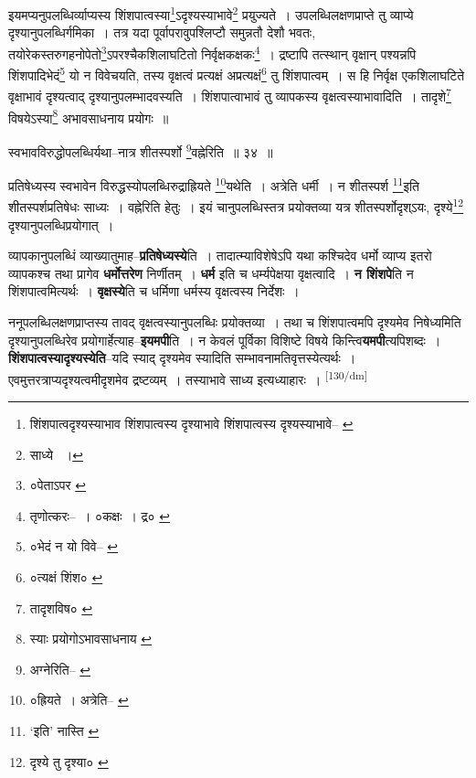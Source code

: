 \documentclass[article,12pt,a4paper]{memoir}
\begin{document}
	  \pstart इयमप्यनुपलब्धिर्व्याप्यस्य शिंशपात्वस्या\footnote{शिंशपात्वदृश्यस्याभाव \cite{dp-msB} शिंशपात्वस्य दृश्याभावे \cite{dp-msA} \cite{dp-edP} \cite{dp-edH} \cite{dp-edE} \cite{dp-edN} शिंशपात्वस्य दृश्यस्याभावे--\cite{dp-msC} \cite{dp-msD}}ऽदृश्यस्याभावे\footnote{साध्ये \cite{dp-msD-n} ।} प्रयुज्यते । उपलब्धिलक्षणप्राप्ते तु व्याप्ये दृश्यानुपलब्धिर्गमिका । तत्र यदा पूर्वापरावुपश्लिप्टौ समुन्नतौ देशौ भवतः, तयोरेकस्तरुगहनोपेतो\footnote{०पेताऽपर \cite{dp-msC}}ऽपरश्चैकशिलाघटितो निर्वृक्षकक्षकः\footnote{तृणोत्करः--\cite{dp-msD-n} । ०कक्षः । द्र० \cite{dp-msA} \cite{dp-msB} \cite{dp-msC} \cite{dp-msD} \cite{dp-edP} \cite{dp-edH} \cite{dp-edE} \cite{dp-edN}} । द्रष्टापि तत्स्थान् वृक्षान् पश्यन्नपि शिंशपादिभेदं\footnote{०भेदं न यो विवे--\cite{dp-msA} \cite{dp-edP} \cite{dp-edH} \cite{dp-edE}} यो न विवेचयति, तस्य वृक्षत्वं प्रत्यक्षं अप्रत्यक्षं\footnote{०त्यक्षं शिंश० \cite{dp-msA} \cite{dp-msB} \cite{dp-msC} \cite{dp-edH} \cite{dp-edE} \cite{dp-edN}} तु शिंशपात्वम् । स हि निर्वृक्ष एकशिलाघटिते वृक्षाभावं दृश्यत्वाद् दृश्यानुपलम्भादवस्यति । शिंशपात्वाभावं तु व्यापकस्य वृक्षत्वस्याभावादिति । तादृशे\footnote{तादृशविष० \cite{dp-msA}} विषयेऽस्या\footnote{स्याः प्रयोगोऽभावसाधनाय \cite{dp-msC}} अभावसाधनाय प्रयोगः ॥
	\pend
       

	  \pstart स्वभावविरुद्धोपलब्धिर्यथा--नात्र शीतस्पर्शो \footnote{अग्नेरिति--\cite{dp-msB} \cite{dp-edP} \cite{dp-edH} \cite{dp-edE} \cite{dp-edN}}वह्नेरिति ॥ ३४ ॥
	\pend
       

	  \pstart प्रतिषेध्यस्य स्वभावेन विरुद्धस्योपलब्धिरुद्राह्रियते \footnote{०ह्रियते । अत्रेति--\cite{dp-msB} \cite{dp-msC} \cite{dp-msD}}यथेति । अत्रेति धर्मी । न शीतस्पर्श \footnote{‘इति’ नास्ति \cite{dp-msA}}इति शीतस्पर्शप्रतिषेधः साध्यः । वह्नेरिति हेतुः । इयं चानुपलब्धिस्तत्र प्रयोक्तव्या यत्र शीतस्पर्शोदृश्ऽयः, दृश्ये\footnote{दृश्ये तु दृश्या० \cite{dp-msB} \cite{dp-msC} \cite{dp-msD}} दृश्यानुपलब्धिप्रयोगात् ।
	\pend
      

	  \pstart व्यापकानुपलब्धिं व्याख्यातुमाह--\textbf{प्रतिषेध्यस्ये}ति । तादात्म्याविशेषेऽपि यथा कश्चिदेव धर्मो व्याप्य इतरो व्यापकश्च तथा प्रागेव \textbf{धर्मोत्तरेण} निर्णीतम् । \textbf{धर्म} इति च धर्म्यपेक्षया वृक्षत्वादि । \textbf{न शिंशपे}ति न शिंशपात्वमित्यर्थः । \textbf{वृक्षस्ये}ति च धर्मिणा धर्मस्य वृक्षत्वस्य निर्देशः ।
	\pend
      

	  \pstart ननूपलब्धिलक्षणप्राप्तस्य तावद् वृक्षत्वस्यानुपलब्धिः प्रयोक्तव्या । तथा च शिंशपात्वमपि दृश्यमेव निषेध्यमिति दृश्यानुपलब्धिरेव प्रयोगार्हेत्याह--\textbf{इयमपी}ति । न केवलं पूर्विका विशिष्टे विषये किन्त्वि\textbf{यमपी}त्यपिशब्दः । \textbf{शिंशपात्वस्यादृश्यस्येति}--यदि स्याद् दृश्यमेव स्यादिति सम्भावनामतिवृत्तस्येत्यर्थः । एवमुत्तरत्राप्यदृश्यत्वमीदृशमेव द्रष्टव्यम् । तस्याभावे साध्य इत्यध्याहारः ।
	\pend
      \leavevmode\textsuperscript{\rmlatinfont\tiny [130/dm]}
\end{document}
